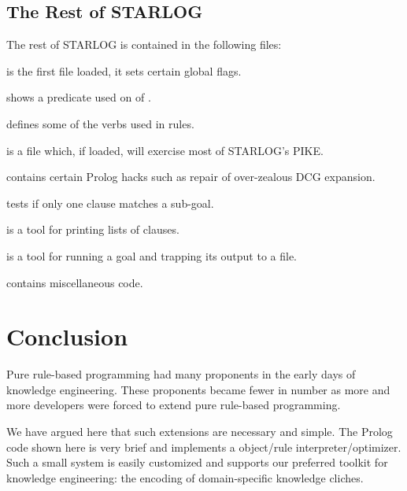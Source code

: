 \documentclass[twocolumn,global]{sys/svjour}
\begin{document}
\subsection{The Rest of STARLOG}

The rest of STARLOG is contained in the following files: \bi \item
{} is the first file loaded, it sets certain global
flags. \item {} shows a predicate used on
 of . \item {} defines
some of the verbs used in rules. \item {} is a file which,
if loaded, will exercise most of STARLOG's PIKE. \item {}
contains certain Prolog hacks such as repair of over-zealous DCG
expansion. \item {} tests if only one clause matches
a sub-goal. \item {} is a tool for printing lists of
clauses. \item {} is a tool for running a goal and
trapping its output to a file. \item {} contains
miscellaneous code.

\ei

  
 









\section{Conclusion}

Pure rule-based programming had many proponents in the early days of
knowledge engineering. These proponents became fewer in number as
more and more developers were forced to extend pure rule-based
programming.

We have argued here that such extensions are necessary and simple.
The Prolog code shown here is very brief and implements a object/rule
interpreter/optimizer. Such a small system is easily customized and
supports our preferred toolkit for knowledge engineering: the
encoding of domain-specific knowledge cliches.
\end{document}
